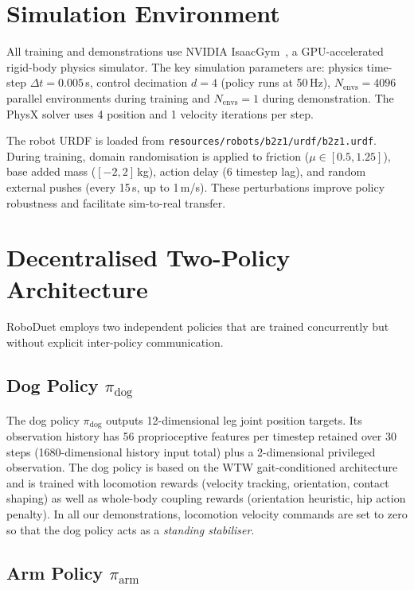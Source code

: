 \section{Simulation Environment}
\label{sec:sim}

All training and demonstrations use NVIDIA IsaacGym~\cite{makoviychuk2021isaac},
a GPU-accelerated rigid-body physics simulator.
The key simulation parameters are:
physics time-step $\Delta t = 0.005$\,s,
control decimation $d = 4$ (policy runs at 50\,Hz),
$N_\text{envs} = 4096$ parallel environments during training and
$N_\text{envs} = 1$ during demonstration.
The PhysX solver uses 4 position and 1 velocity iterations per step.

The robot URDF is loaded from
\texttt{resources/robots/b2z1/urdf/b2z1.urdf}.
During training, domain randomisation is applied to friction
($\mu \in [0.5, 1.25]$), base added mass ($[-2, 2]$\,kg), action delay
(6 timestep lag), and random external pushes (every 15\,s, up to 1\,m/s).
These perturbations improve policy robustness and facilitate sim-to-real
transfer.

\section{Decentralised Two-Policy Architecture}
\label{sec:architecture}

RoboDuet employs two independent policies that are trained concurrently but
without explicit inter-policy communication.

\subsection{Dog Policy \texorpdfstring{$\pi_\text{dog}$}{pi-dog}}

The dog policy $\pi_\text{dog}$ outputs 12-dimensional leg joint position
targets.
Its observation history has 56 proprioceptive features per timestep
retained over 30 steps (1680-dimensional history input total) plus a
2-dimensional privileged observation.
The dog policy is based on the WTW gait-conditioned
architecture~\cite{margolis2023walk} and is trained with locomotion rewards
(velocity tracking, orientation, contact shaping) as well as whole-body
coupling rewards (orientation heuristic, hip action penalty).
In all our demonstrations, locomotion velocity commands are set to zero so
that the dog policy acts as a \emph{standing stabiliser}.

\subsection{Arm Policy \texorpdfstring{$\pi_\text{arm}$}{pi-arm}}

